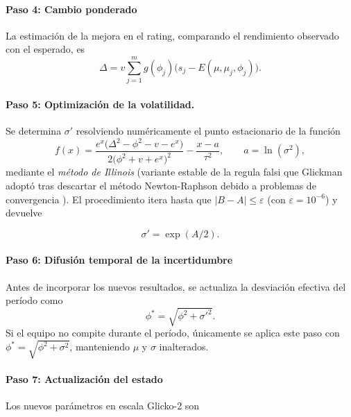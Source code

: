 \begin{definition}
	\paragraph*{Paso 4: Cambio ponderado} La estimaci\'on de la mejora en el rating, comparando el rendimiento observado con el esperado, es
	\begin{equation}\label{eq:glicko2_delta}
		\Delta=v\sum_{j=1}^{m}g(\phi_j)\bigl(s_j-E(\mu,\mu_j,\phi_j)\bigr).
	\end{equation}
	
	\paragraph*{Paso 5: Optimizaci\'on de la volatilidad.} Se determina $\sigma'$ resolviendo num\'ericamente el punto estacionario de la funci\'on
	\begin{equation}\label{eq:glicko2_f}
		f(x)=\frac{e^{x}\bigl(\Delta^{2}-\phi^{2}-v-e^{x}\bigr)}
		{2\bigl(\phi^{2}+v+e^{x}\bigr)^{2}}-\frac{x-a}{\tau^{2}},
		\qquad a=\ln(\sigma^{2}),
	\end{equation}
	mediante el \emph{m\'etodo de Illinois} (variante estable de la regula falsi que Glickman adopt\'o tras descartar el m\'etodo Newton-Raphson debido a problemas de convergencia \cite{Glickman2022}). El procedimiento itera hasta que $|B-A|\leq\varepsilon$ (con $\varepsilon=10^{-6}$) y devuelve
	
	\begin{equation}\label{eq:glicko2_sigma_prime}
		\sigma'=\exp(A/2).
	\end{equation}
	
	\paragraph*{Paso 6: Difusi\'on temporal de la incertidumbre} Antes de incorporar los nuevos resultados, se actualiza la desviaci\'on efectiva del per\'iodo como
	\begin{equation}\label{eq:glicko2_phi_star}
		\phi^{*}=\sqrt{\phi^{2}+\sigma'^{2}}.
	\end{equation}
	Si el equipo no compite durante el per\'iodo, \'unicamente se aplica este paso con $\phi^{*}=\sqrt{\phi^{2}+\sigma^{2}}$, manteniendo $\mu$ y $\sigma$ inalterados.
	
	\paragraph*{Paso 7: Actualizaci\'on del estado} Los nuevos par\'ametros en escala Glicko-2 son
	

\end{definition}

